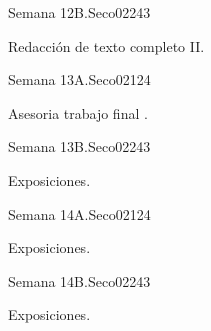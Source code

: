 \begin{syllabus}
\begin{unit}{Semana 12B.}{Seco02}{24}{3}
   \begin{topics}
      \item Redacción de texto completo  II.
   \end{topics}

   \begin{learningoutcomes}
      \item 
      \item
      \item 
      \end{learningoutcomes}
\end{unit}


\begin{unit}{Semana 13A.}{Seco02}{12}{4}
   \begin{topics}
      \item Asesoria trabajo final .
   \end{topics}
   \begin{learningoutcomes}
      \item 
   \end{learningoutcomes}
\end{unit}

\begin{unit}{Semana 13B.}{Seco02}{24}{3}
   \begin{topics}
      \item Exposiciones.
   \end{topics}

   \begin{learningoutcomes}
      \item 
      \item
      \item 
      \end{learningoutcomes}
\end{unit}


\begin{unit}{Semana 14A.}{Seco02}{12}{4}
   \begin{topics}
      \item Exposiciones.
   \end{topics}
   \begin{learningoutcomes}
      \item 
   \end{learningoutcomes}
\end{unit}

\begin{unit}{Semana 14B.}{Seco02}{24}{3}
   \begin{topics}
      \item Exposiciones.
   \end{topics}


\end{unit}
\end{syllabus}
